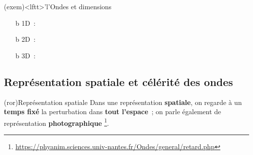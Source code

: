 \documentclass[../../main/main.tex]{subfiles}
\begin{document}
\begin{tcb}(exem)<lftt>'l'{Ondes et dimensions}
	\begin{itemize}
		\item[b]{1D}~:
		\item[b]{2D}~:
		\item[b]{3D}~:
	\end{itemize}
	\vspace{-15pt}
\end{tcb}

\subsection{Représentation spatiale et célérité des ondes}

\begin{tcb}[sidebyside, lefthand ratio=.45](ror){Représentation spatiale}
	Dans une représentation \textbf{spatiale}, on regarde à un \textbf{temps
		fixé} la perturbation dans \textbf{tout l'espace}~; on parle également de
	représentation \textbf{photographique}%
	\footnote{\url{https://phyanim.sciences.univ-nantes.fr/Ondes/general/retard.php}}.
	\tcblower
	\begin{center}
		\vspace{-15pt}
	\end{center}
\end{tcb}
\end{document}
